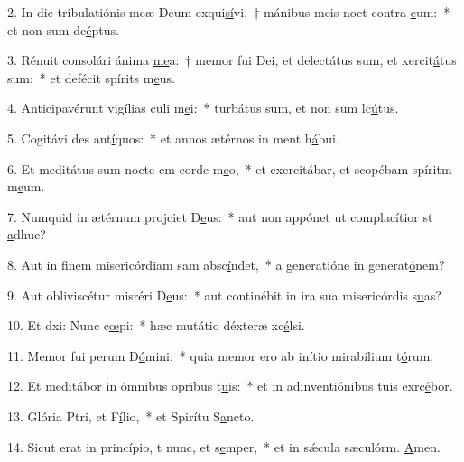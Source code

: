 2. In die tribulatiónis meæ Deum exqui\uline{sí}vi,~† mánibus meis noct contra \uline{e}um:~* et non sum dc\uline{é}ptus.\par 
3. Rénuit consolári ánima \uline{me}a:~† memor fui Dei, et delectátus sum, et xercit\uline{á}tus sum:~* et defécit spírits m\uline{e}us.\par 
4. Anticipavérunt vigílias culi m\uline{e}i:~* turbátus sum, et non sum lc\uline{ú}tus.\par 
5. Cogitávi des ant\uline{í}quos:~* et annos ætérnos in ment h\uline{á}bui.\par 
6. Et meditátus sum nocte cm corde m\uline{e}o,~* et exercitábar, et scopébam spíritm m\uline{e}um.\par 
7. Numquid in ætérnum projciet D\uline{e}us:~* aut non appónet ut complacítior st \uline{a}dhuc?\par 
8. Aut in finem misericórdiam sam absc\uline{í}ndet,~* a generatióne in generat\uline{ó}nem?\par 
9. Aut obliviscétur misréri D\uline{e}us:~* aut continébit in ira sua misericórdis s\uline{u}as?\par 
10. Et dxi: Nunc c\uline{œ}pi:~* hæc mutátio déxteræ xc\uline{é}lsi.\par 
11. Memor fui perum D\uline{ó}mini:~* quia memor ero ab inítio mirabílium t\uline{ó}rum.\par 
12. Et meditábor in ómnibus opribus t\uline{u}is:~* et in adinventiónibus tuis exrc\uline{é}bor.\par 
13. Glória Ptri, et F\uline{í}lio,~* et Spirítu S\uline{a}ncto.\par 
14. Sicut erat in princípio, t nunc, et s\uline{e}mper,~* et in sǽcula sæculórm. \uline{A}men.\par 
